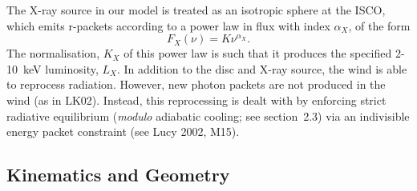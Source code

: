 \documentclass[useAMS,usenatbib]{mn2e_x}
\begin{document}
The X-ray source in our model is treated as an isotropic sphere at the ISCO,
which emits r-packets according to a power law in flux with index $\alpha_X$, of the form
\begin{equation}
F_X (\nu) = K \nu^{\alpha_X}.
\end{equation}
The normalisation, $K_X$ of this power law is such that it 
produces the specified 2-10~keV luminosity, $L_X$.
In addition to the disc and X-ray source, 
the wind is able to reprocess radiation. However, new 
photon packets are not produced in the wind (as in LK02). 
Instead, this reprocessing is dealt with by enforcing strict
radiative equilibrium ({\em modulo} adiabatic cooling; see section~2.3)
via an indivisible energy packet
constraint (see Lucy 2002, M15).









\subsection{Kinematics and Geometry}
\end{document}
